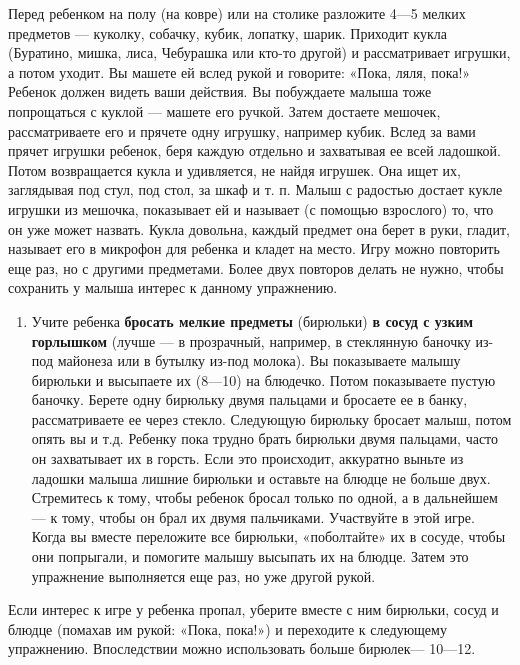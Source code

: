 \documentclass[a5paper]{book}
\begin{document}
Перед ребенком на полу (на ковре) или на столике разложите 4---5 мелких
предметов --- куколку, собачку, кубик, лопатку, шарик. Приходит кукла
(Буратино, мишка, лиса, Чебурашка или кто-то другой) и рассматривает
игрушки, а потом уходит. Вы машете ей вслед рукой и говорите: «Пока,
ляля, пока!» Ребенок должен видеть ваши действия. Вы побуждаете малыша
тоже попрощаться с куклой --- машете его ручкой. Затем достаете мешочек,
рассматриваете его и прячете одну игрушку, например кубик. Вслед за вами
прячет игрушки ребенок, беря каждую отдельно и захватывая ее всей
ладошкой. Потом возвращается кукла и удивляется, не найдя игрушек. Она
ищет их, заглядывая под стул, под стол, за шкаф и т. п. Малыш с радостью
достает кукле игрушки из мешочка, показывает ей и называет (с помощью
взрослого) то, что он уже может назвать. Кукла довольна, каждый предмет
она берет в руки, гладит, называет его в микрофон для ребенка и кладет
на место. Игру можно повторить еще раз, но с другими предметами. Более
двух повторов делать не нужно, чтобы сохранить у малыша интерес к
данному упражнению.


\begin{enumerate}
\def\labelenumi{\arabic{enumi}.}
\setcounter{enumi}{2}
\item
  
  Учите ребенка \textbf{бросать мелкие предметы} (бирюльки) \textbf{в
  сосуд с узким горлышком} (лучше --- в прозрачный, например, в
  стеклянную баночку из-под майонеза или в бутылку из-под молока). Вы
  показываете малышу бирюльки и высыпаете их (8---10) на блюдечко. Потом
  показываете пустую баночку. Берете одну бирюльку двумя пальцами и
  бросаете ее в банку, рассматриваете ее через стекло. Следующую
  бирюльку бросает малыш, потом опять вы и т.д. Ребенку пока трудно
  брать бирюльки двумя пальцами, часто он захватывает их в горсть. Если
  это происходит, аккуратно выньте из ладошки малыша лишние бирюльки и
  оставьте на блюдце не больше двух. Стремитесь к тому, чтобы ребенок
  бросал только по одной, а в дальнейшем --- к тому, чтобы он брал их
  двумя пальчиками. Участвуйте в этой игре. Когда вы вместе переложите
  все бирюльки, «поболтайте» их в сосуде, чтобы они попрыгали, и
  помогите малышу высыпать их на блюдце. Затем это упражнение
  выполняется еще раз, но уже другой рукой.
  
\end{enumerate}


Если интерес к игре у ребенка пропал, уберите вместе с ним бирюльки,
сосуд и блюдце (помахав им рукой: «Пока, пока!») и переходите к
следующему упражнению. Впоследствии можно использовать больше бирюлек---
10---12.
\end{document}
